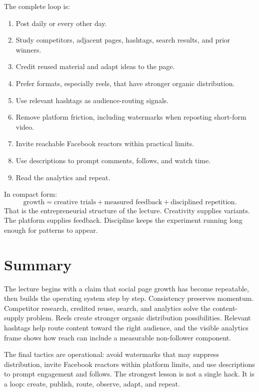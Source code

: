The complete loop is:
\begin{enumerate}
\item Post daily or every other day.
\item Study competitors, adjacent pages, hashtags, search results, and prior winners.
\item Credit reused material and adapt ideas to the page.
\item Prefer formats, especially reels, that have stronger organic distribution.
\item Use relevant hashtags as audience-routing signals.
\item Remove platform friction, including watermarks when reposting short-form video.
\item Invite reachable Facebook reactors within practical limits.
\item Use descriptions to prompt comments, follows, and watch time.
\item Read the analytics and repeat.
\end{enumerate}

In compact form:
\begin{equation}
\text{growth}
=
\text{creative trials}
+
\text{measured feedback}
+
\text{disciplined repetition}.
\end{equation}
That is the entrepreneurial structure of the lecture. Creativity supplies variants. The platform supplies feedback. Discipline keeps the experiment running long enough for patterns to appear.

\section{Summary}

The lecture begins with a claim that social page growth has become repeatable, then builds the operating system step by step. Consistency preserves momentum. Competitor research, credited reuse, search, and analytics solve the content-supply problem. Reels create stronger organic distribution possibilities. Relevant hashtags help route content toward the right audience, and the visible analytics frame shows how reach can include a measurable non-follower component.

The final tactics are operational: avoid watermarks that may suppress distribution, invite Facebook reactors within platform limits, and use descriptions to prompt engagement and follows. The strongest lesson is not a single hack. It is a loop: create, publish, route, observe, adapt, and repeat.